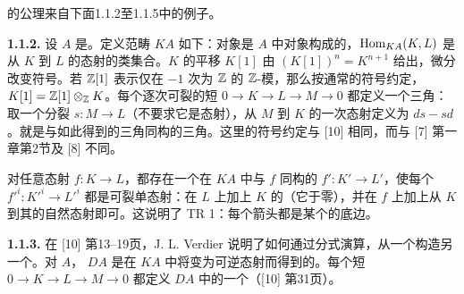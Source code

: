 的公理来自下面1.1.2至1.1.5中的例子。

\par\medskip\noindent\textbf{1.1.2.} 设 $A$ 是。定义范畴 $KA$ 如下：对象是 $A$ 中对象构成的，$\operatorname{Hom}_{KA}(K,L)$ 是从 $K$ 到 $L$ 的态射的类集合。$K$ 的平移 $K[1]$ 由 $(K[1])^n=K^{n+1}$ 给出，微分改变符号。若 $\mathbb Z[1]$ 表示仅在 $-1$ 次为 $\mathbb Z$ 的 $\mathbb Z$-模，那么按通常的符号约定，$K[1]=\mathbb Z[1]\otimes_{\mathbb Z}K$。每个逐次可裂的短 $0\to K\to L\to M\to0$ 都定义一个三角：取一个分裂 $s:M\to L$（不要求它是态射），从 $M$ 到 $K$ 的一次态射定义为 $ds-sd$。就是与如此得到的三角同构的三角。这里的符号约定与 [10] 相同，而与 [7] 第一章第2节及 [8] 不同。

对任意态射 $f:K\to L$，都存在一个在 $KA$ 中与 $f$ 同构的 $f':K'\to L'$，使每个 $f'^i:K'^i\to L'^i$ 都是可裂单态射：在 $L$ 上加上 $K$ 的（它于零），并在 $f$ 上加上从 $K$ 到其的自然态射即可。这说明了 TR 1：每个箭头都是某个的底边。

\par\medskip\noindent\textbf{1.1.3.} 在 [10] 第13--19页，J. L. Verdier 说明了如何通过分式演算，从一个构造另一个。对 $A$， $DA$ 是在 $KA$ 中将变为可逆态射而得到的。每个短 $0\to K\to L\to M\to0$ 都定义 $DA$ 中的一个（[10] 第31页）。


